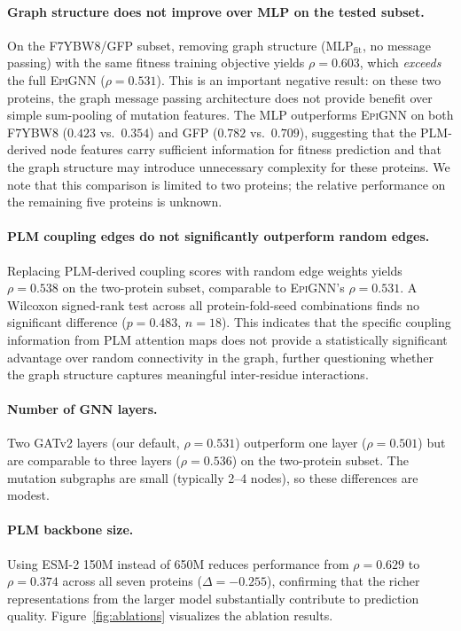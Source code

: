 \documentclass{article}
\newcommand{\epignn}{\textsc{EpiGNN}}
\newcommand{\ftmlp}{MLP$_\text{fit}$}
\begin{document}
\paragraph{Graph structure does not improve over MLP on the tested subset.}
On the F7YBW8/GFP subset, removing graph structure (\ftmlp{}, no message passing) with the same fitness training objective yields $\rho = 0.603$, which \emph{exceeds} the full \epignn{} ($\rho = 0.531$).
This is an important negative result: on these two proteins, the graph message passing architecture does not provide benefit over simple sum-pooling of mutation features.
The MLP outperforms \epignn{} on both F7YBW8 ($0.423$ vs.\ $0.354$) and GFP ($0.782$ vs.\ $0.709$), suggesting that the PLM-derived node features carry sufficient information for fitness prediction and that the graph structure may introduce unnecessary complexity for these proteins.
We note that this comparison is limited to two proteins; the relative performance on the remaining five proteins is unknown.

\paragraph{PLM coupling edges do not significantly outperform random edges.}
Replacing PLM-derived coupling scores with random edge weights yields $\rho = 0.538$ on the two-protein subset, comparable to \epignn{}'s $\rho = 0.531$.
A Wilcoxon signed-rank test across all protein-fold-seed combinations finds no significant difference ($p = 0.483$, $n = 18$).
This indicates that the specific coupling information from PLM attention maps does not provide a statistically significant advantage over random connectivity in the graph, further questioning whether the graph structure captures meaningful inter-residue interactions.

\paragraph{Number of GNN layers.}
Two GATv2 layers (our default, $\rho = 0.531$) outperform one layer ($\rho = 0.501$) but are comparable to three layers ($\rho = 0.536$) on the two-protein subset.
The mutation subgraphs are small (typically 2--4 nodes), so these differences are modest.

\paragraph{PLM backbone size.}
Using ESM-2 150M instead of 650M reduces performance from $\rho = 0.629$ to $\rho = 0.374$ across all seven proteins ($\Delta = -0.255$), confirming that the richer representations from the larger model substantially contribute to prediction quality.
Figure~\ref{fig:ablations} visualizes the ablation results.
\end{document}
